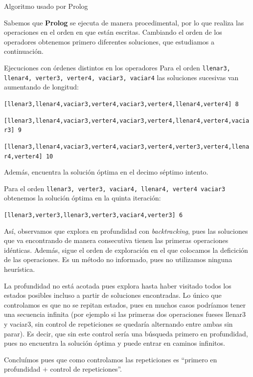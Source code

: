 \documentclass[11pt, a4paper, spanish, openright, twoside]{book}
\begin{document}
	\begin{section}{Algoritmo usado por Prolog}

		Sabemos que \textbf{Prolog} se ejecuta de manera procedimental, por lo que realiza las operaciones en el orden en que están escritas. Cambiando el orden de los operadores obtenemos primero diferentes soluciones, que estudiamos a continuación.

		\begin{subsection}{Ejecuciones con órdenes distintos en los operadores}
			Para el orden \texttt{llenar3, llenar4, verter3, verter4, vaciar3, vaciar4} las soluciones sucesivas van aumentando de longitud:

			\texttt{[llenar3,llenar4,vaciar3,verter4,vaciar3,verter4,llenar4,verter4] 8}
         
			\texttt{[llenar3,llenar4,vaciar3,verter4,vaciar3,verter4,llenar4,verter4,vaciar3] 9}
			
      \texttt{[llenar3,llenar4,vaciar3,verter4,vaciar3,verter4,verter3,verter4,llenar4,verter4] 10}
			
			Además, encuentra la solución óptima en el decimo séptimo intento.

			Para el orden \texttt{llenar3, verter3, vaciar4, llenar4, verter4 vaciar3} obtenemos la solución óptima en la quinta iteración: 
			
			\texttt{[llenar3,verter3,llenar3,verter3,vaciar4,verter3]  6}
         
			
		\end{subsection}

		Así, observamos que explora en profundidad con \textit{backtracking}, pues las soluciones que va encontrando de manera consecutiva tienen las primeras operaciones idénticas. Además, 
		sigue el orden de exploración en el que colocamos la deficición de las operaciones. Es un método no informado, pues no utilizamos ninguna heurística. 

La profundidad no está acotada 
		pues explora hasta haber visitado todos los estados posibles incluso a partir de soluciones encontradas. Lo único que controlamos es que no se repitan estados, pues en muchos casos podríamos tener una secuencia infinita (por ejemplo si las primeras dos operaciones fueses llenar3 y vaciar3, sin control de repeticiones se quedaría alternando entre ambas sin parar). Es decir, que sin este control sería una búsqueda 
		primero en profundidad, pues no encuentra la solución óptima y puede entrar en caminos infinitos. 

Concluímos pues que como controlamos las repeticiones es ``primero en profundidad $+$ control de repeticiones''.

	
	\end{section}
\end{document}
